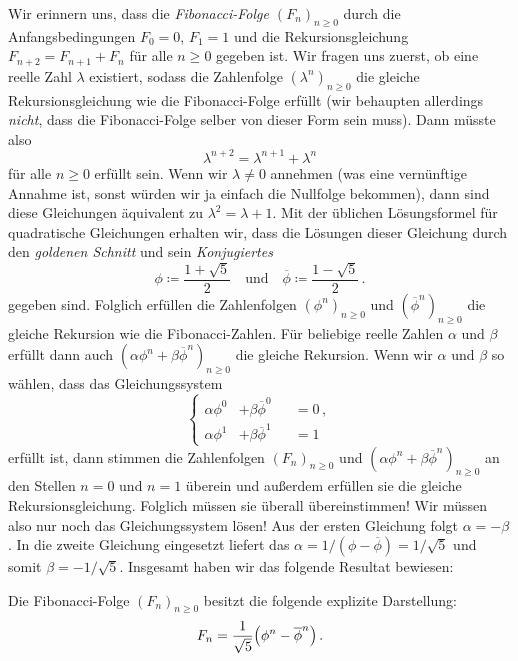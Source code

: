 Wir erinnern uns, dass die \emph{Fibonacci-Folge $(F_n)_{n\geqslant 0}$} durch die Anfangsbedingungen $F_0=0$, $F_1=1$ und die Rekursionsgleichung $F_{n+2}=F_{n+1}+F_n$ für alle $n \geqslant 0$ gegeben ist. Wir fragen uns zuerst, ob eine reelle Zahl $\lambda$ existiert, sodass die Zahlenfolge $(\lambda^n)_{n\geqslant 0}$ die gleiche Rekursionsgleichung wie die Fibonacci-Folge erfüllt (wir behaupten allerdings \emph{nicht}, dass die Fibonacci-Folge selber von dieser Form sein muss). Dann müsste also
\begin{equation*}
	\lambda^{n+2}=\lambda^{n+1}+\lambda^n
\end{equation*}
für alle $n\geqslant 0$ erfüllt sein. Wenn wir $\lambda\neq 0$ annehmen (was eine vernünftige Annahme ist, sonst würden wir ja einfach die Nullfolge bekommen), dann sind diese Gleichungen äquivalent zu $\lambda^2=\lambda+1$. Mit der üblichen Lösungsformel für quadratische Gleichungen erhalten wir, dass die Lösungen dieser Gleichung durch den \emph{goldenen Schnitt} und sein \emph{Konjugiertes}
\begin{equation*}
	\phi\coloneqq\frac{1+\sqrt{5}}{2}\quad\text{und}\quad \overline{\phi}\coloneqq\frac{1-\sqrt
		5}{2}\,.
\end{equation*}
gegeben sind. Folglich erfüllen die Zahlenfolgen $(\phi^n)_{n\geqslant 0}$ und $(\overline{\phi}^n)_{n\geqslant 0}$ die gleiche Rekursion wie die Fibonacci-Zahlen. Für beliebige reelle Zahlen $\alpha$ und $\beta$ erfüllt dann auch $(\alpha\phi^n+\beta\overline{\phi}^n)_{n\geqslant 0}$ die gleiche Rekursion. Wenn wir $\alpha$ und $\beta$ so wählen, dass das Gleichungssystem
\begin{equation*}
	\left\{\begin{alignedat}{2}
		\alpha\phi^0&+\beta\overline{\phi}^0&&=0\,,\\
		\alpha\phi^1&+\beta\overline{\phi}^1&&=1
	\end{alignedat}\right.
\end{equation*}
erfüllt ist, dann stimmen die Zahlenfolgen $(F_n)_{n\geqslant 0}$ und $(\alpha\phi^n+\beta\overline{\phi}^n)_{n\geqslant 0}$ an den Stellen $n=0$ und $n=1$ überein und außerdem erfüllen sie die gleiche Rekursionsgleichung. Folglich müssen sie überall übereinstimmen! Wir müssen also nur noch das Gleichungssystem lösen! Aus der ersten Gleichung folgt $\alpha=-\beta$. In die zweite Gleichung eingesetzt liefert das $\alpha=1/(\phi-\overline{\phi})=1/{\sqrt{5}}$ und somit $\beta=-1/{\sqrt{5}}$. Insgesamt haben wir das folgende Resultat bewiesen:
\begin{satzmitnamen}
	Die Fibonacci-Folge $(F_n)_{n\geqslant 0}$ besitzt die folgende explizite Darstellung:
	\begin{equation*}
		F_n=\frac{1}{\sqrt{5}}\parens*{\phi^n-\overline{\phi}^n}\,.
	\end{equation*}
\end{satzmitnamen}
